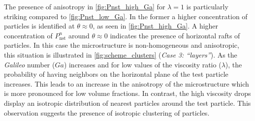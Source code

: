 The presence of anisotropy in \ref{fig:Pnst_high_Ga} for $\lambda=1$ is particularly striking compared to \ref{fig:Pnst_low_Ga}. 
In the former a higher concentration of particles is identified at $\theta \approx 0$, as seen in \ref{fig:Pnst_high_Ga}. 
A higher concentration of $P_\text{nst}^n$ around $\theta \approx 0$ indicates the presence of horizontal rafts of particles. 
In this case the microstructure is non-homogeneous and anisotropic, this situation is illustrated in \ref{fig:scheme_clusters} (\textit{Case 3: ``layers''}). 
As the \textit{Galileo} number ($Ga$) increases and for low values of the viscosity ratio ($\lambda$), the probability of having neighbors on the horizontal plane of the test particle increases. 
This leads to an increase in the anisotropy of the microstructure which is more pronounced for low volume fractions. 
In contrast, the high viscosity drops display an isotropic distribution of nearest particles around the test particle. 
This observation suggests the presence of isotropic clustering of particles.





